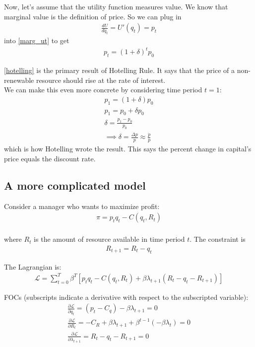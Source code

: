 \documentclass[12pt]{article}
\begin{document}
Now, let's assume that the utility function measures value. We know that marginal value is the definition of price. So we can plug in 
\begin{align}
     \frac{dU}{dq_t} = U'(q_t) = p_t
\end{align}
into \ref{marg_ut} to get 
\begin{align}
    p_t = (1+ \delta)^t p_0 \label{hotelling}
\end{align}

 \ref{hotelling} is the primary result of Hotelling Rule. It says that the price of a non-renewable resource should rise at the rate of interest.\\

We can make this even more concrete by considering time period $t=1$:
\begin{align}
    p_1 = (1+ \delta) p_0\\
    p_1 = p_0 + \delta p_0\\
    \delta = \frac{p_1 - p_0}{p_0}\\
    \implies \delta = \frac{\Delta p}{p} \approx \frac{\dot p}{p}
\end{align}
which is how Hotelling wrote the result. This says the percent change in capital's price equals the discount rate.  

\subsection{A more complicated model}
Consider a manager who wants to maximize profit: 
\begin{align}
    \pi = p_t q_t - C(q_t, R_t)\\
\end{align}

where $R_t$ is the amount of resource available in time period $t$. The constraint is 
\begin{align}
    R_{t+1} = R_t - q_t
\end{align}

The Lagrangian is: 
\begin{align}
    \mathcal{L} = \sum_{t = 0}^T \beta^T [p_t q_t - C(q_t, R_t) + \beta \lambda_{t+1}(R_t - q_t - R_{t+1})]
\end{align}

FOCs (subscripts indicate a derivative with respect to the subscripted variable):
\begin{align}
    \frac{\partial \mathcal{L}}{ \partial q_t} = (p_t - C_q) - \beta \lambda_{t+1} = 0 \label{comp_FOC_1}\\
    \frac{\partial \mathcal{L}}{\partial R_t} = -C_R + \beta \lambda_{t+1}  + \beta^{t-1}(-\beta\lambda_t)= 0 \label{comp_FOC_2}\\
    \frac{\partial \mathcal{L}}{\partial \lambda_{t+1}} = R_t - q_t - R_{t+1} =0
\end{align}
\end{document}
